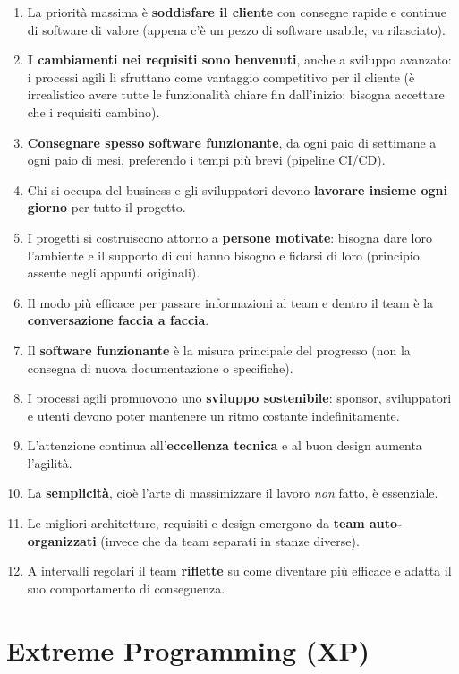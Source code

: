 \begin{enumerate}
\def\labelenumi{\arabic{enumi}.}
\tightlist
\item
  La priorità massima è \textbf{soddisfare il cliente} con consegne
  rapide e continue di software di valore (appena c'è un pezzo di
  software usabile, va rilasciato).
\item
  \textbf{I cambiamenti nei requisiti sono benvenuti}, anche a sviluppo
  avanzato: i processi agili li sfruttano come vantaggio competitivo per
  il cliente (è irrealistico avere tutte le funzionalità chiare fin
  dall'inizio: bisogna accettare che i requisiti cambino).
\item
  \textbf{Consegnare spesso software funzionante}, da ogni paio di
  settimane a ogni paio di mesi, preferendo i tempi più brevi (pipeline
  CI/CD).
\item
  Chi si occupa del business e gli sviluppatori devono \textbf{lavorare
  insieme ogni giorno} per tutto il progetto.
\item
  I progetti si costruiscono attorno a \textbf{persone motivate}:
  bisogna dare loro l'ambiente e il supporto di cui hanno bisogno e
  fidarsi di loro (principio assente negli appunti originali).
\item
  Il modo più efficace per passare informazioni al team e dentro il team
  è la \textbf{conversazione faccia a faccia}.
\item
  Il \textbf{software funzionante} è la misura principale del progresso
  (non la consegna di nuova documentazione o specifiche).
\item
  I processi agili promuovono uno \textbf{sviluppo sostenibile}:
  sponsor, sviluppatori e utenti devono poter mantenere un ritmo
  costante indefinitamente.
\item
  L'attenzione continua all'\textbf{eccellenza tecnica} e al buon design
  aumenta l'agilità.
\item
  La \textbf{semplicità}, cioè l'arte di massimizzare il lavoro
  \emph{non} fatto, è essenziale.
\item
  Le migliori architetture, requisiti e design emergono da \textbf{team
  auto-organizzati} (invece che da team separati in stanze diverse).
\item
  A intervalli regolari il team \textbf{riflette} su come diventare più
  efficace e adatta il suo comportamento di conseguenza.
\end{enumerate}

\section{Extreme Programming (XP)}\label{extreme-programming-xp}

